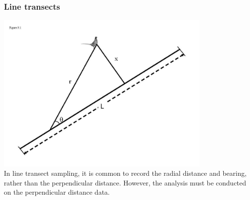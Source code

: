 \documentclass[color=usenames,dvipsnames]{beamer}\usepackage[]{graphicx}\usepackage[]{color}
\begin{document}
\begin{frame}
  \frametitle{Line transects}
  \centering
  \includegraphics[width=0.8\textwidth]{figs/Fig9-1} \\
  In line transect sampling, it is common to record the radial
  distance and bearing, rather than the perpendicular
  distance. However, the analysis must be conducted on the
  perpendicular distance data. \\
\end{frame}
\end{document}
